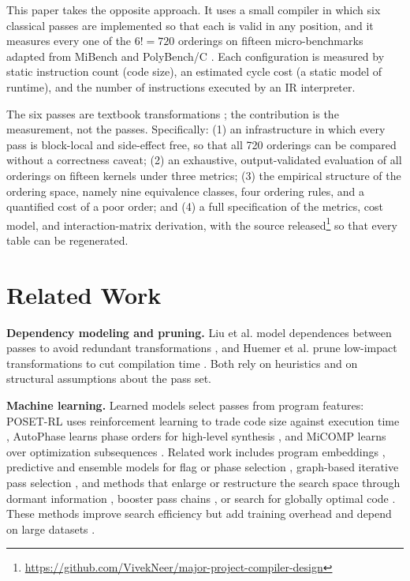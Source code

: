 \documentclass[conference]{IEEEtran}
\begin{document}
This paper takes the opposite approach. It uses a small compiler in which six classical passes are implemented so that each is valid in any position, and it measures every one of the $6! = 720$ orderings on fifteen micro-benchmarks adapted from MiBench \cite{ref32} and PolyBench/C \cite{ref31}. Each configuration is measured by static instruction count (code size), an estimated cycle cost (a static model of runtime), and the number of instructions executed by an IR interpreter.

The six passes are textbook transformations \cite{ref18,ref21}; the contribution is the measurement, not the passes. Specifically: (1) an infrastructure in which every pass is block-local and side-effect free, so that all 720 orderings can be compared without a correctness caveat; (2) an exhaustive, output-validated evaluation of all orderings on fifteen kernels under three metrics; (3) the empirical structure of the ordering space, namely nine equivalence classes, four ordering rules, and a quantified cost of a poor order; and (4) a full specification of the metrics, cost model, and interaction-matrix derivation, with the source released\footnote{\url{https://github.com/VivekNeer/major-project-compiler-design}} so that every table can be regenerated.

\section{Related Work}

\textbf{Dependency modeling and pruning.} Liu et al. model dependences between passes to avoid redundant transformations \cite{ref1}, and Huemer et al. prune low-impact transformations to cut compilation time \cite{ref4}. Both rely on heuristics and on structural assumptions about the pass set.

\textbf{Machine learning.} Learned models select passes from program features: POSET-RL uses reinforcement learning to trade code size against execution time \cite{ref8}, AutoPhase learns phase orders for high-level synthesis \cite{ref12}, and MiCOMP learns over optimization subsequences \cite{ref15}. Related work includes program embeddings \cite{ref9}, predictive and ensemble models for flag or phase selection \cite{ref17,ref22,ref28,ref29}, graph-based iterative pass selection \cite{ref20}, and methods that enlarge or restructure the search space through dormant information \cite{ref2,ref26}, booster pass chains \cite{ref25}, or search for globally optimal code \cite{ref3}. These methods improve search efficiency but add training overhead and depend on large datasets \cite{ref8,ref12,ref15}.
\end{document}

